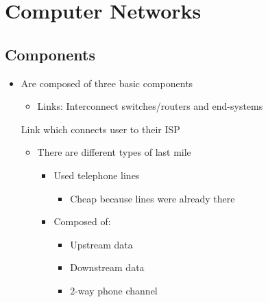
\section{Computer Networks}
\subsection{Components}
\begin{itemize}
    \item Are composed of three basic components
        \begin{itemize}
                \begin{itemize}
                    \item Send and receive data
                    \item Represent the users of a networks
                    \item Huge diversity of such devices
                \end{itemize}
             Forward data to the destination
            \item{Links:} Interconnect switches/routers and end-systems
        \end{itemize}
     Link which connects user to their ISP
        \begin{itemize}
            \item There are different types of last mile
                    \begin{itemize}
                        \item Used telephone lines
                            \begin{itemize}
                                \item Cheap because lines were already there
                            \end{itemize}
                        \item Composed of:
                            \begin{itemize}
                                \item Upstream data
                                \item Downstream data
                                \item $2$-way phone channel
                            \end{itemize}

\end{itemize}
\end{itemize}
\end{itemize}
